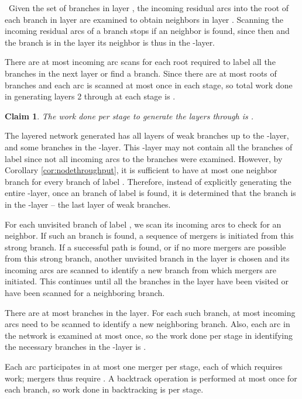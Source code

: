 \documentclass{article}
\newtheorem{claim}{Claim}[section]
\begin{document}
~Given the set of  branches in layer , the incoming residual arcs into the root of each  branch in layer  are examined to obtain neighbors in layer . Scanning the incoming residual arcs of a  branch stops if an  neighbor is found, since then  and the  branch is in the  layer its  neighbor is thus in the -layer.

There are at most  incoming arc scans for each  root required to label all the  branches in the next layer or find a  branch.   Since there are at most  roots of  branches and each arc is scanned at most once in each stage, so total work done in generating layers 2 through  at each stage is .

\begin{claim}
The work done per stage to generate the layers  through  is .
\end{claim}

The layered network generated has all layers of weak branches up to the -layer, and some  branches in the -layer. This -layer may not contain all the  branches of label  since not all incoming arcs to the  branches were examined. However, by Corollary \ref{cor:nodethroughput}, it is sufficient to have at most one neighbor  branch for every  branch of label . Therefore, instead of explicitly generating the entire -layer, once an  branch of label  is found, it is determined that the  branch is in the -layer -- the last layer of weak branches.

For each unvisited  branch of label , we scan its incoming arcs to check for an  neighbor. If such an  branch is found, a sequence of mergers is initiated from this strong branch. If a successful path is found, or if no more mergers are possible from this strong branch, another unvisited  branch in the  layer is chosen and its incoming arcs are scanned to identify a new  branch from which mergers are initiated. This continues until all the  branches in the  layer have been visited or have been scanned for a neighboring  branch.

There are at most  branches in the  layer. For each such branch, at most  incoming arcs need to be scanned to identify a new neighboring  branch. Also, each arc in the network is examined at most once, so the work done per stage in identifying the necessary  branches in the -layer is .

Each arc participates in at most one merger per stage, each of which requires  work; mergers thus require . A backtrack operation is performed at most once for each  branch, so work done in backtracking is  per stage.
\end{document}
